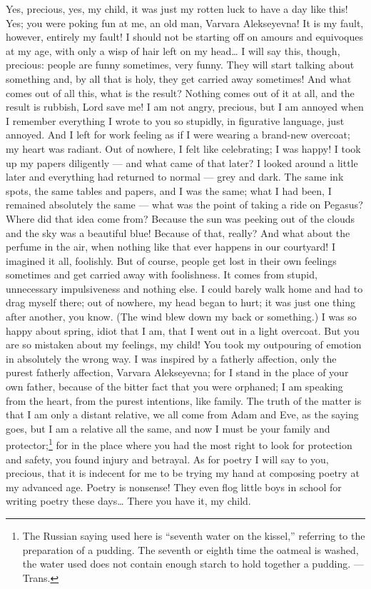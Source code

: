 Yes, precious, yes, my child, it was just my rotten luck to have a day like this! Yes; you were poking fun at me, an old man, Varvara Alekseyevna! It is my fault, however, entirely my fault! I should not be starting off on amours and equivoques at my age, with only a wisp of hair left on my head\ldots{} I will say this, though, precious: people are funny sometimes, very funny. They will start talking about something and, by all that is holy, they get carried away sometimes! And what comes out of all this, what is the result? Nothing comes out of it at all, and the result is rubbish, Lord save me! I am not angry, precious, but I am annoyed when I remember everything I wrote to you so stupidly, in figurative language, just annoyed. And I left for work feeling as if I were wearing a brand-new overcoat; my heart was radiant. Out of nowhere, I felt like celebrating; I was happy! I took up my papers diligently --- and what came of that later? I looked around a little later and everything had returned to normal --- grey and dark. The same ink spots, the same tables and papers, and I was the same; what I had been, I remained absolutely the same --- what was the point of taking a ride on Pegasus? Where did that idea come from? Because the sun was peeking out of the clouds and the sky was a beautiful blue! Because of that, really? And what about the perfume in the air, when nothing like that ever happens in our courtyard! I imagined it all, foolishly. But of course, people get lost in their own feelings sometimes and get carried away with foolishness. It comes from stupid, unnecessary impulsiveness and nothing else. I could barely walk home and had to drag myself there; out of nowhere, my head began to hurt; it was just one thing after another, you know. (The wind blew down my back or something.) I was so happy about spring, idiot that I am, that I went out in a light overcoat. But you are so mistaken about my feelings, my child! You took my outpouring of emotion in absolutely the wrong way. I was inspired by a fatherly affection, only the purest fatherly affection, Varvara Alekseyevna; for I stand in the place of your own father, because of the bitter fact that you were orphaned; I am speaking from the heart, from the purest intentions, like family. The truth of the matter is that I am only a distant relative, we all come from Adam and Eve, as the saying goes, but I am a relative all the same, and now I must be your family and protector;\footnote{The Russian saying used here is ``seventh water on the kissel,'' referring to the preparation of a pudding. The seventh or eighth time the oatmeal is washed, the water used does not contain enough starch to hold together a pudding. --- Trans.} for in the place where you had the most right to look for protection and safety, you found injury and betrayal. As for poetry I will say to you, precious, that it is indecent for me to be trying my hand at composing poetry at my advanced age. Poetry is nonsense! They even flog little boys in school for writing poetry these days\ldots{} There you have it, my child.